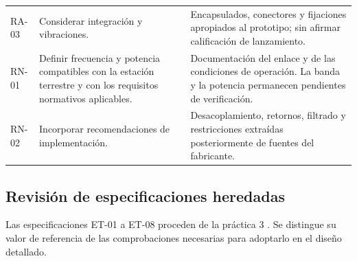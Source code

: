 \documentclass[11pt,letterpaper]{article}
\begin{document}
\begin{longtable}{L{1.7cm}L{5.6cm}L{7.1cm}}
RA-03 & Considerar integración y vibraciones. & Encapsulados, conectores y fijaciones apropiados al prototipo; sin afirmar calificación de lanzamiento. \\
RN-01 & Definir frecuencia y potencia compatibles con la estación terrestre y con los requisitos normativos aplicables. & Documentación del enlace y de las condiciones de operación. La banda y la potencia permanecen pendientes de verificación. \\
RN-02 & Incorporar recomendaciones de implementación. & Desacoplamiento, retornos, filtrado y restricciones extraídas posteriormente de fuentes del fabricante. \\
\bottomrule
\end{longtable}
\normalsize

\subsection{Revisión de especificaciones heredadas}
Las especificaciones ET-01 a ET-08 proceden de la práctica 3 \cite{lab3}. Se distingue su valor de referencia de las comprobaciones necesarias para adoptarlo en el diseño detallado.
\small
\end{document}
